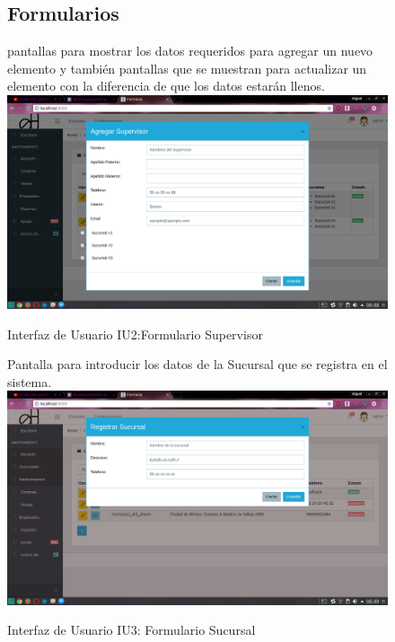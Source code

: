 \begin{figure}[htbp!]
	\begin{center}
	\subsection{Formularios}
	pantallas para mostrar los datos requeridos para agregar un nuevo elemento
y también pantallas que se muestran para actualizar un elemento 
con la diferencia de que los datos estarán llenos.
		\includegraphics[width=\textwidth]{Pantallas/FormularioSupervisor}
		\caption{Interfaz de Usuario IU2:Formulario Supervisor}
	\end{center}
\end{figure}




\begin{figure}[htbp!]
	\begin{center}
	Pantalla para introducir los datos de la Sucursal que se registra en el sistema.
\includegraphics[width=\textwidth]{Pantallas/FormularioSucursal}
		\caption{Interfaz de Usuario IU3: Formulario Sucursal}
	\end{center}
\end{figure}


